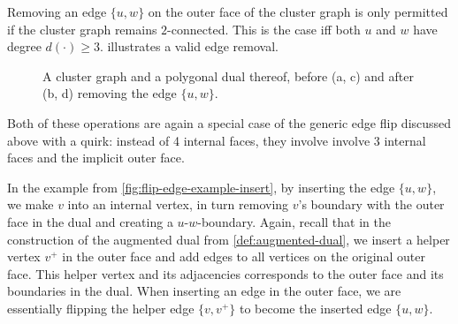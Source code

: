 Removing an edge $\{u,w\}$ on the outer face of the cluster graph is only permitted if the cluster graph remains $2$-connected. This is the case iff both $u$ and $w$ have degree $d(\cdot) \geq 3$.  illustrates a valid edge removal.

\begin{figure}[H]
	\centering
	\quad
	\qquad
	\quad
	\caption{A cluster graph and a polygonal dual thereof, before (a, c) and after (b, d) removing the edge $\{u,w\}$.}
	\label{fig:flip-edge-example-remove}
\end{figure}

Both of these operations are again a special case of the generic edge flip discussed above with a quirk: instead of 4 internal faces, they involve involve 3 internal faces and the implicit outer face.

In the example from \cref{fig:flip-edge-example-insert}, by inserting the edge $\{u,w\}$, we make $v$ into an internal vertex, in turn removing $v$'s boundary with the outer face in the dual and creating a $u$-$w$-boundary. Again, recall that in the construction of the augmented dual from \cref{def:augmented-dual}, we insert a helper vertex $v^+$ in the outer face and add edges to all vertices on the original outer face. This helper vertex and its adjacencies corresponds to the outer face and its boundaries in the dual. When inserting an edge in the outer face, we are essentially flipping the helper edge $\{v,v^+\}$ to become the inserted edge $\{u,w\}$.

